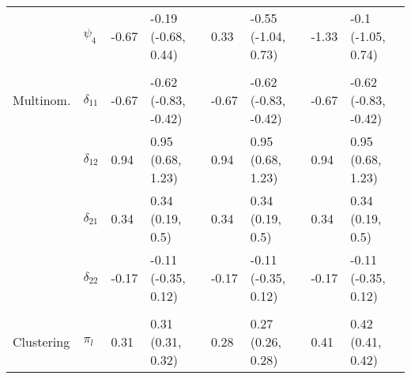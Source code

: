 \documentclass[]{article}
\begin{document}
\begin{table}[t]
\begin{tabular}{llllllll}
\hspace{1em} & $\psi_{4}$ & -0.67 & -0.19 (-0.68, 0.44) & 0.33 & -0.55 (-1.04, 0.73) & -1.33 & -0.1 (-1.05, 0.74)\\
\addlinespace[0.3em]
\multicolumn{8}{l}{\textbf{ }}\\
\hspace{1em}Multinom. & $\delta_{11}$ & -0.67 & -0.62 (-0.83, -0.42) & -0.67 & -0.62 (-0.83, -0.42) & -0.67 & -0.62 (-0.83, -0.42)\\
\hspace{1em} & $\delta_{12}$ & 0.94 & 0.95 (0.68, 1.23) & 0.94 & 0.95 (0.68, 1.23) & 0.94 & 0.95 (0.68, 1.23)\\
\hspace{1em} & $\delta_{21}$ & 0.34 & 0.34 (0.19, 0.5) & 0.34 & 0.34 (0.19, 0.5) & 0.34 & 0.34 (0.19, 0.5)\\
\hspace{1em} & $\delta_{22}$ & -0.17 & -0.11 (-0.35, 0.12) & -0.17 & -0.11 (-0.35, 0.12) & -0.17 & -0.11 (-0.35, 0.12)\\
\addlinespace[0.3em]
\multicolumn{8}{l}{\textbf{ }}\\
\hspace{1em}Clustering & $\pi_l$ & 0.31 & 0.31 (0.31, 0.32) & 0.28 & 0.27 (0.26, 0.28) & 0.41 & 0.42 (0.41, 0.42)\\
\bottomrule
\end{tabular}
\end{table}
\end{document}
